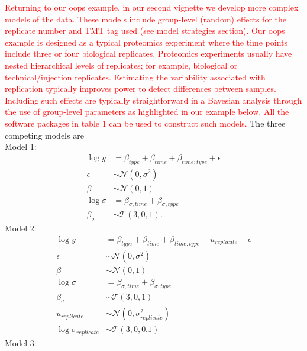 \documentclass[12pt,english, journal=jpr, layout=twocolumn]{article}
\begin{document}
\textcolor{red}{Returning to our oops example, in our second vignette we develop more complex models of the data. These models include group-level (random) effects for the replicate number and TMT tag used (see model strategies section). Our oops example is designed as a typical proteomics experiment where the time points include three or four biological replicates. Proteomics experiments usually have nested hierarchical levels of replicates; for example, biological or technical/injection replicates. Estimating the variability associated with replication typically improves power to detect differences between samples. Including such effects are typically straightforward in a Bayesian analysis through the use of group-level parameters as highlighted in our example below. All the software packages in table 1 can be used to construct such models. } The three competing models are
\\
Model 1:
\begin{equation}
	\begin{split}
		\log y &= \beta_{type} + \beta_{time} + \beta_{time:type} + \epsilon\\
		\epsilon &\sim \mathcal{N}(0, \sigma^2)\\
		\beta &\sim \mathcal{N}(0, 1)\\
		\log \sigma &=  \beta_{\sigma, time} + \beta_{\sigma, type} \\
		\beta_{\sigma} &\sim \mathcal{T}(3, 0 , 1).
	\end{split}
\end{equation}
Model 2:
\begin{equation}
	\begin{split}
		\log y &= \beta_{type} + \beta_{time} + \beta_{time:type} + u_{replicate} +  \epsilon\\
		\epsilon &\sim \mathcal{N}(0, \sigma^2)\\
		\beta &\sim \mathcal{N}(0, 1)\\
		\log \sigma &=  \beta_{\sigma, time} + \beta_{\sigma, type}\\
		\beta_{\sigma} &\sim \mathcal{T}(3, 0 , 1)\\
		u_{replicate} &  \sim\mathcal{N}(0, \sigma^2_{replicate})\\
		\log \sigma_{replicate} & \sim \mathcal{T}(3, 0 , 0.1)
	\end{split}
\end{equation}
Model 3:
\end{document}
